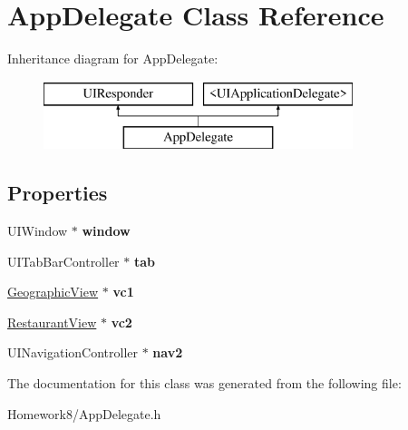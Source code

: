 \hypertarget{interface_app_delegate}{}\section{App\+Delegate Class Reference}
\label{interface_app_delegate}
Inheritance diagram for App\+Delegate\+:\begin{figure}[H]
\begin{center}
\leavevmode
\includegraphics[height=2.000000cm]{interface_app_delegate}
\end{center}
\end{figure}
\subsection*{Properties}
\begin{DoxyCompactItemize}
\item 
\mbox{\label{interface_app_delegate_acf48ac24125e688cac1a85445cd7fac2}} 
U\+I\+Window $\ast$ {\bfseries window}
\item 
\mbox{\label{interface_app_delegate_a83fbaeeffead75ba8e2bc50360b34c18}} 
U\+I\+Tab\+Bar\+Controller $\ast$ {\bfseries tab}
\item 
\mbox{\label{interface_app_delegate_a2d349e5d90658808241775ac95279afe}} 
\hyperlink{interface_geographic_view}{Geographic\+View} $\ast$ {\bfseries vc1}
\item 
\mbox{\label{interface_app_delegate_a8fc69d08569e5a6547ceeb5ba52d13e2}} 
\hyperlink{interface_restaurant_view}{Restaurant\+View} $\ast$ {\bfseries vc2}
\item 
\mbox{\label{interface_app_delegate_a33d5e0a6fbd7ae8a3142f03622551b3a}} 
U\+I\+Navigation\+Controller $\ast$ {\bfseries nav2}
\end{DoxyCompactItemize}


The documentation for this class was generated from the following file\+:\begin{DoxyCompactItemize}
\item 
Homework8/App\+Delegate.\+h\end{DoxyCompactItemize}
